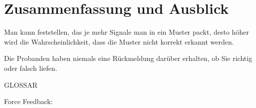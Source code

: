 
\chapter{Zusammenfassung und Ausblick}
\label{ch:Zusammenfassung}


Man kann feststellen, das je mehr Signale man in ein Muster packt, desto höher wird die Wahrscheinlichkeit, dass die Muster nicht korrekt erkannt werden. 

Die Probanden haben niemals eine R{\"u}ckmeldung dar{\"u}ber erhalten, ob Sie richtig oder falsch liefen.






GLOSSAR

Force Feedback:

